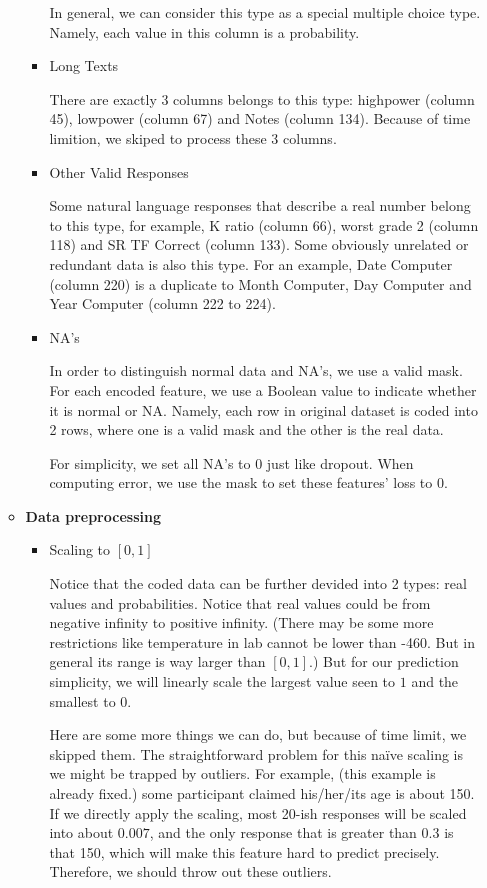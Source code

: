 \documentclass[11pt, a4paper]{article}
\makeatletter
\def\namedlabel#1#2{\begingroup
	\def\@currentlabel{#2}%
	\phantomsection\label{#1}\endgroup
}
\makeatother
\begin{document}
\begin{enumerate}
\begin{itemize}
\begin{itemize}
			\par{In general, we can consider this type as a special multiple choice type. Namely, each value in this column is a probability.}
			\item {Long Texts}
			\par{There are exactly 3 columns belongs to this type: highpower (column 45), lowpower (column 67) and Notes (column 134). Because of time limition, we skiped to process these 3 columns.}
			\item {Other Valid Responses}
			\par{Some natural language responses that describe a real number belong to this type, for example, K ratio (column 66), worst grade 2 (column 118) and SR TF Correct (column 133). Some obviously unrelated or redundant data is also this type. For an example, Date Computer (column 220) is a duplicate to Month Computer, Day Computer and Year Computer (column 222 to 224).}
			\item {NA's}
			\par{In order to distinguish normal data and NA's, we use a valid mask. For each encoded feature, we use a Boolean value to indicate whether it is normal or NA. Namely, each row in original dataset is coded into 2 rows, where one is a valid mask and the other is the real data.}
			\par{For simplicity, we set all NA’s to 0 just like dropout. When computing error, we use the mask to set these features’ loss to 0.}
		\end{itemize}
		\item {\textbf{Data preprocessing}}
		\namedlabel{preprocessing}{Data preprocessing}
		\begin{itemize}
			\item {Scaling to $[0, 1]$}
			\par{Notice that the coded data can be further devided into 2 types: real values and probabilities. Notice that real values could be from negative infinity to positive infinity. (There may be some more restrictions like temperature in lab cannot be lower than -460. But in general its range is way larger than $[0, 1]$.) But for our prediction simplicity, we will linearly scale the largest value seen to $1$ and the smallest to $0$.}
			\par{Here are some more things we can do, but because of time limit, we skipped them. The straightforward problem for this naïve scaling is we might be trapped by outliers. For example, (this example is already fixed.) some participant claimed his/her/its age is about 150. If we directly apply the scaling, most 20-ish responses will be scaled into about $0.007$, and the only response that is greater than $0.3$ is that 150, which will make this feature hard to predict precisely. Therefore, we should throw out these outliers.}

\end{itemize}
\end{itemize}
\end{enumerate}
\end{document}
